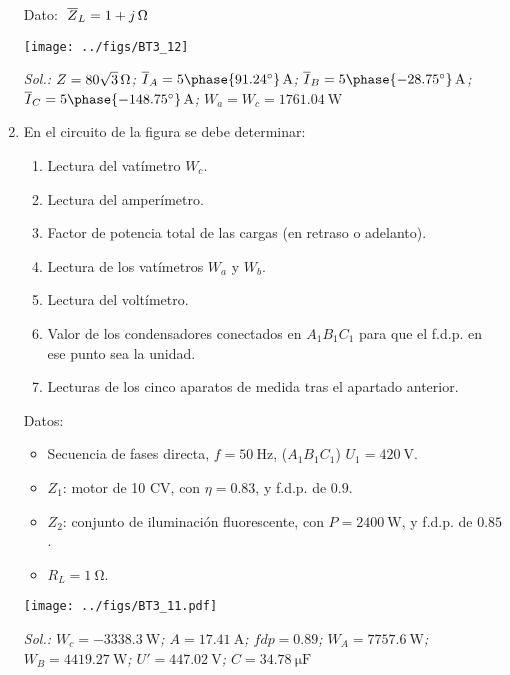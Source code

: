 \begin{enumerate}
Dato: $\; \overline{Z}_L = \SI[parse-numbers = false]{1 + j}{\ohm}$
\begin{center}
  \texttt{[image: ../figs/BT3\_12]}
\end{center}


\emph{Sol.:\; $ Z = \SI[parse-numbers=false]{80\sqrt{3}}{\ohm}$;\;
  $ \overline{I}_A = {5\phase{91.24^\circ}}\,\unit{\ampere}$;\;
  $ \overline{I}_B = {5\phase{-28.75^\circ}}\,\unit{\ampere}$;\;
  $ \overline{I}_C = {5\phase{-148.75^\circ}}\,\unit{\ampere}$;\;
  $ W_a = W_c = \SI{1761.04}{\watt}$}

\item En el circuito de la figura se debe determinar:

\begin{enumerate}
\item Lectura del vatímetro $W_c$.
\item Lectura del amperímetro.
\item Factor de potencia total de las cargas (en retraso o adelanto).
\item Lectura de los vatímetros $W_a$ y $W_b$.
\item Lectura del voltímetro.
\item Valor de los condensadores conectados en $A_1B_1C_1$ para que el
  f.d.p. en ese punto sea la unidad.
\item Lecturas de los cinco aparatos de medida tras el apartado
  anterior.
\end{enumerate}

Datos:
\begin{itemize}
\item Secuencia de fases directa, $f = \SI{50}{\hertz}$, ($A_1B_1C_1$)
  $U_1 = \SI{420}{\volt}$.
\item $Z_1$: motor de 10 CV, con $\eta = 0.83$, y f.d.p. de $0.9$.
\item $Z_2$: conjunto de iluminación fluorescente, con
  $P = \SI{2400}{\watt}$, y f.d.p. de $0.85$.
\item $R_L = \SI{1}{\ohm}$.
\end{itemize}

\begin{center}
  \texttt{[image: ../figs/BT3\_11.pdf]}
\end{center}

\emph{Sol.:\; $ W_c = \qty{-3338.3}{\watt}$;\;
  $ A = \SI{17.41}{\ampere}$;\; $ fdp = 0.89$;\;
  $ W_A = \SI{7757.6}{\watt}$;\; $ W_B = \SI{4419.27}{\watt}$;\;
  $ U' = \SI{447.02}{\volt}$;\; $ C = \SI{34.78}{\micro\farad}$}


\end{enumerate}
